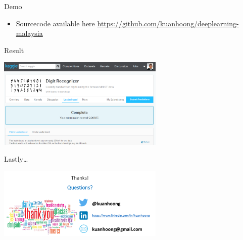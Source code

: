 \documentclass[ignorenonframetext,]{beamer}
\providecommand{\tightlist}{%
\setlength{\itemsep}{0pt}\setlength{\parskip}{0pt}}
\begin{document}
\begin{frame}{Demo}

\begin{itemize}
\tightlist
\item
  Sourcecode available here
  \url{https://github.com/kuanhoong/deeplearning-malaysia}
\end{itemize}

\end{frame}

\begin{frame}{Result}

\includegraphics[width=300px]{images/mxnet-kaggle}

\end{frame}

\begin{frame}{Lastly\ldots{}}

\includegraphics[width=300px]{images/thankyou}

\end{frame}
\end{document}
